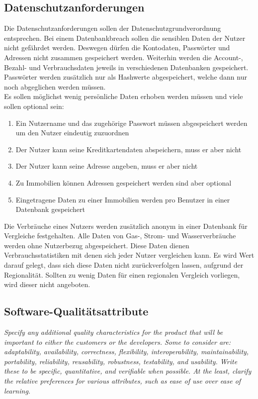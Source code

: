 \subsection{Datenschutzanforderungen}
Die Datenschutzanforderungen sollen der Datenschutzgrundverordnung entsprechen. 
Bei einem Datenbankbreach sollen die sensiblen Daten der Nutzer nicht gefährdet werden. 
Deswegen dürfen die Kontodaten, Passwörter und Adressen nicht zusammen gespeichert werden. 
Weiterhin werden die Account-, Bezahl- und Verbrauchsdaten jeweils in verschiedenen Datenbanken gespeichert. 
Passwörter werden zusätzlich nur als Hashwerte abgespeichert, welche dann nur noch abgeglichen werden müssen.\\
Es sollen möglichst wenig persönliche Daten erhoben werden müssen und viele sollen optional sein:

\begin{enumerate}
    \item Ein Nutzername und das zugehörige Passwort müssen abgespeichert werden um den Nutzer eindeutig zuzuordnen
    \item Der Nutzer kann seine Kreditkartendaten abspeichern, muss er aber nicht
    \item Der Nutzer kann seine Adresse angeben, muss er aber nicht
    \item Zu Immobilien können Adressen gespeichert werden sind aber optional
    \item Eingetragene Daten zu einer Immobilien werden pro Benutzer in einer Datenbank gespeichert
\end{enumerate}
Die Verbräuche eines Nutzers werden zusätzlich anonym in einer Datenbank für Vergleiche festgehalten. Alle Daten von Gas-, Strom- und Wasserverbräuche werden ohne Nutzerbezug abgespeichert. Diese Daten dienen Verbrauchsstatistiken mit denen sich jeder Nutzer vergleichen kann. Es wird Wert darauf gelegt, dass sich diese Daten nicht zurückverfolgen lassen, aufgrund der Regionalität. Sollten zu wenig Daten für einen regionalen Vergleich vorliegen, wird dieser nicht angeboten.

\subsection{Software-Qualitätsattribute}
\textit{Specify any additional quality characteristics for the product that will be important to either the customers or
the developers.
Some to consider are: adaptability, availability, correctness, flexibility, 
interoperability, maintainability, portability, reliability, reusability, 
robustness, testability, and usability. Write these to be specific, quantitative, 
and verifiable when possible.
At the least, clarify the relative preferences for various attributes, 
such as ease of use over ease of learning.}

